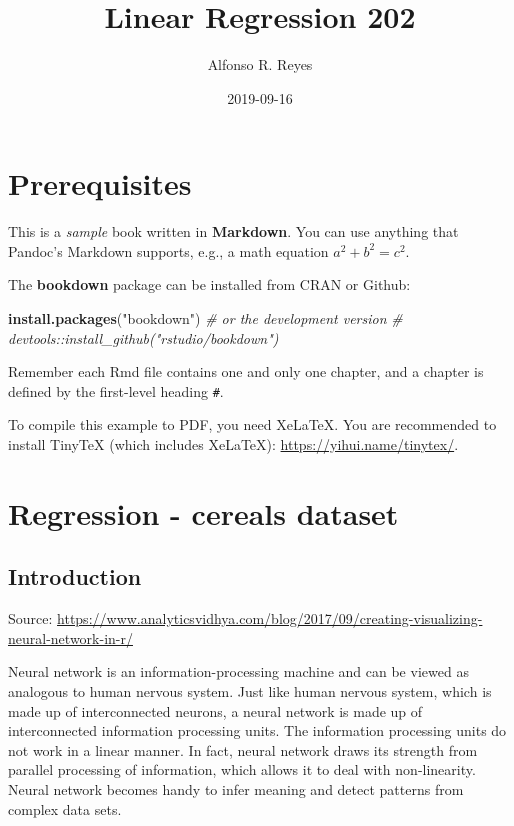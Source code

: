 \documentclass[]{book}
\title{Linear Regression 202}
\author{Alfonso R. Reyes}
\date{2019-09-16}
\newenvironment{Shaded}{\begin{snugshade}}{\end{snugshade}}
\newcommand{\CommentTok}[1]{\textcolor[rgb]{0.56,0.35,0.01}{\textit{#1}}}
\newcommand{\KeywordTok}[1]{\textcolor[rgb]{0.13,0.29,0.53}{\textbf{#1}}}
\newcommand{\NormalTok}[1]{#1}
\newcommand{\StringTok}[1]{\textcolor[rgb]{0.31,0.60,0.02}{#1}}
\begin{document}
\maketitle

{
\setcounter{tocdepth}{1}
\tableofcontents
}
\hypertarget{prerequisites}{%
\chapter*{Prerequisites}\label{prerequisites}}

This is a \emph{sample} book written in \textbf{Markdown}. You can use anything that Pandoc's Markdown supports, e.g., a math equation \(a^2 + b^2 = c^2\).

The \textbf{bookdown} package can be installed from CRAN or Github:

\begin{Shaded}
\begin{Highlighting}[]
\KeywordTok{install.packages}\NormalTok{(}\StringTok{"bookdown"}\NormalTok{)}
\CommentTok{# or the development version}
\CommentTok{# devtools::install_github("rstudio/bookdown")}
\end{Highlighting}
\end{Shaded}

Remember each Rmd file contains one and only one chapter, and a chapter is defined by the first-level heading \texttt{\#}.

To compile this example to PDF, you need XeLaTeX. You are recommended to install TinyTeX (which includes XeLaTeX): \url{https://yihui.name/tinytex/}.

\hypertarget{regression---cereals-dataset}{%
\chapter{Regression - cereals dataset}\label{regression---cereals-dataset}}

\hypertarget{introduction}{%
\section{Introduction}\label{introduction}}

Source: \url{https://www.analyticsvidhya.com/blog/2017/09/creating-visualizing-neural-network-in-r/}

Neural network is an information-processing machine and can be viewed as analogous to human nervous system. Just like human nervous system, which is made up of interconnected neurons, a neural network is made up of interconnected information processing units. The information processing units do not work in a linear manner. In fact, neural network draws its strength from parallel processing of information, which allows it to deal with non-linearity. Neural network becomes handy to infer meaning and detect patterns from complex data sets.
\end{document}
